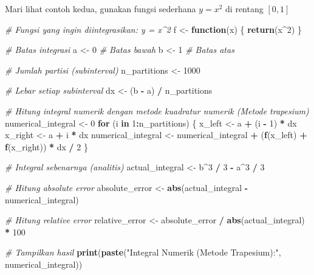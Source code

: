 \documentclass[
]{book}
\newenvironment{Shaded}{\begin{snugshade}}{\end{snugshade}}
\newcommand{\CommentTok}[1]{\textcolor[rgb]{0.56,0.35,0.01}{\textit{#1}}}
\newcommand{\ControlFlowTok}[1]{\textcolor[rgb]{0.13,0.29,0.53}{\textbf{#1}}}
\newcommand{\DecValTok}[1]{\textcolor[rgb]{0.00,0.00,0.81}{#1}}
\newcommand{\FunctionTok}[1]{\textcolor[rgb]{0.13,0.29,0.53}{\textbf{#1}}}
\newcommand{\NormalTok}[1]{#1}
\newcommand{\OtherTok}[1]{\textcolor[rgb]{0.56,0.35,0.01}{#1}}
\newcommand{\SpecialCharTok}[1]{\textcolor[rgb]{0.81,0.36,0.00}{\textbf{#1}}}
\newcommand{\StringTok}[1]{\textcolor[rgb]{0.31,0.60,0.02}{#1}}
\theoremstyle{definition}
\theoremstyle{definition}
\theoremstyle{definition}
\theoremstyle{definition}
\theoremstyle{remark}
\begin{document}
Mari lihat contoh kedua, gunakan fungsi sederhana \(y = x^2\) di rentang \([0, 1]\)

\begin{Shaded}
\begin{Highlighting}[]
\CommentTok{\# Fungsi yang ingin diintegrasikan: y = x\^{}2}
\NormalTok{f }\OtherTok{\textless{}{-}} \ControlFlowTok{function}\NormalTok{(x) \{}
  \FunctionTok{return}\NormalTok{(x}\SpecialCharTok{\^{}}\DecValTok{2}\NormalTok{)}
\NormalTok{\}}

\CommentTok{\# Batas integrasi}
\NormalTok{a }\OtherTok{\textless{}{-}} \DecValTok{0}  \CommentTok{\# Batas bawah}
\NormalTok{b }\OtherTok{\textless{}{-}} \DecValTok{1}  \CommentTok{\# Batas atas}

\CommentTok{\# Jumlah partisi (subinterval)}
\NormalTok{n\_partitions }\OtherTok{\textless{}{-}} \DecValTok{1000}

\CommentTok{\# Lebar setiap subinterval}
\NormalTok{dx }\OtherTok{\textless{}{-}}\NormalTok{ (b }\SpecialCharTok{{-}}\NormalTok{ a) }\SpecialCharTok{/}\NormalTok{ n\_partitions}

\CommentTok{\# Hitung integral numerik dengan metode kuadratur numerik (Metode trapesium)}
\NormalTok{numerical\_integral }\OtherTok{\textless{}{-}} \DecValTok{0}
\ControlFlowTok{for}\NormalTok{ (i }\ControlFlowTok{in} \DecValTok{1}\SpecialCharTok{:}\NormalTok{n\_partitions) \{}
\NormalTok{  x\_left }\OtherTok{\textless{}{-}}\NormalTok{ a }\SpecialCharTok{+}\NormalTok{ (i }\SpecialCharTok{{-}} \DecValTok{1}\NormalTok{) }\SpecialCharTok{*}\NormalTok{ dx}
\NormalTok{  x\_right }\OtherTok{\textless{}{-}}\NormalTok{ a }\SpecialCharTok{+}\NormalTok{ i }\SpecialCharTok{*}\NormalTok{ dx}
\NormalTok{  numerical\_integral }\OtherTok{\textless{}{-}}\NormalTok{ numerical\_integral }\SpecialCharTok{+}\NormalTok{ (}\FunctionTok{f}\NormalTok{(x\_left) }\SpecialCharTok{+} \FunctionTok{f}\NormalTok{(x\_right)) }\SpecialCharTok{*}\NormalTok{ dx }\SpecialCharTok{/} \DecValTok{2}
\NormalTok{\}}

\CommentTok{\# Integral sebenarnya (analitis)}
\NormalTok{actual\_integral }\OtherTok{\textless{}{-}}\NormalTok{ b}\SpecialCharTok{\^{}}\DecValTok{3} \SpecialCharTok{/} \DecValTok{3} \SpecialCharTok{{-}}\NormalTok{ a}\SpecialCharTok{\^{}}\DecValTok{3} \SpecialCharTok{/} \DecValTok{3}

\CommentTok{\# Hitung absolute error}
\NormalTok{absolute\_error }\OtherTok{\textless{}{-}} \FunctionTok{abs}\NormalTok{(actual\_integral }\SpecialCharTok{{-}}\NormalTok{ numerical\_integral)}

\CommentTok{\# Hitung relative error}
\NormalTok{relative\_error }\OtherTok{\textless{}{-}}\NormalTok{ absolute\_error }\SpecialCharTok{/} \FunctionTok{abs}\NormalTok{(actual\_integral) }\SpecialCharTok{*} \DecValTok{100}

\CommentTok{\# Tampilkan hasil}
\FunctionTok{print}\NormalTok{(}\FunctionTok{paste}\NormalTok{(}\StringTok{"Integral Numerik (Metode Trapesium):"}\NormalTok{, numerical\_integral))}
\end{Highlighting}
\end{Shaded}
\end{document}
